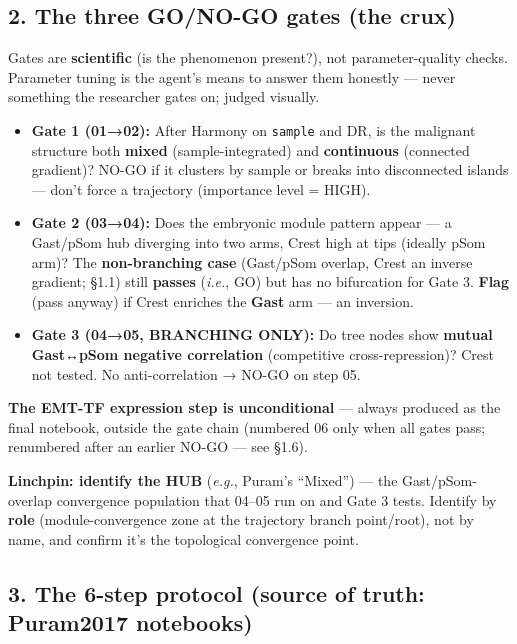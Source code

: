 \documentclass[11pt,a4paper]{article}
\providecommand{\tightlist}{\setlength{\itemsep}{0pt}\setlength{\parskip}{0pt}}
\begin{document}
\hypertarget{the-three-gono-go-gates-the-crux}{%
\subsection{2. The three GO/NO-GO gates (the crux)}\label{the-three-gono-go-gates-the-crux}}

Gates are \textbf{scientific} (is the phenomenon present?), not
parameter-quality checks. Parameter tuning is the agent's means to
answer them honestly --- never something the researcher gates on; judged
visually.

\begin{itemize}
\tightlist
\item
  \textbf{Gate 1 (01→02):} After Harmony on \texttt{sample} and DR, is the
  malignant structure both \textbf{mixed} (sample-integrated) and
  \textbf{continuous} (connected gradient)? NO-GO if it clusters by
  sample or breaks into disconnected islands --- don't force a
  trajectory (importance level = HIGH).
\item
  \textbf{Gate 2 (03→04):} Does the embryonic module pattern appear ---
  a Gast/pSom hub diverging into two arms, Crest high at tips (ideally
  pSom arm)? The \textbf{non-branching case} (Gast/pSom overlap, Crest
  an inverse gradient; §1.1) still \textbf{passes} (\emph{i.e.}, GO) but
  has no bifurcation for Gate 3. \textbf{Flag} (pass anyway) if Crest
  enriches the \textbf{Gast} arm --- an inversion.
\item
  \textbf{Gate 3 (04→05, BRANCHING ONLY):} Do tree nodes show
  \textbf{mutual Gast↔pSom negative correlation} (competitive
  cross-repression)? Crest not tested. No anti-correlation → NO-GO on
  step 05.
\end{itemize}

\textbf{The EMT-TF expression step is unconditional} --- always produced
as the final notebook, outside the gate chain (numbered 06 only when all
gates pass; renumbered after an earlier NO-GO --- see §1.6).

\textbf{Linchpin: identify the HUB} (\emph{e.g.}, Puram's ``Mixed'') ---
the Gast/pSom-overlap convergence population that 04--05 run on and Gate
3 tests. Identify by \textbf{role} (module-convergence zone at the
trajectory branch point/root), not by name, and confirm it's the
topological convergence point.

\hypertarget{the-6-step-protocol-source-of-truth-puram2017-notebooks}{%
\subsection{3. The 6-step protocol (source of truth: Puram2017 notebooks)}\label{the-6-step-protocol-source-of-truth-puram2017-notebooks}}
\end{document}
